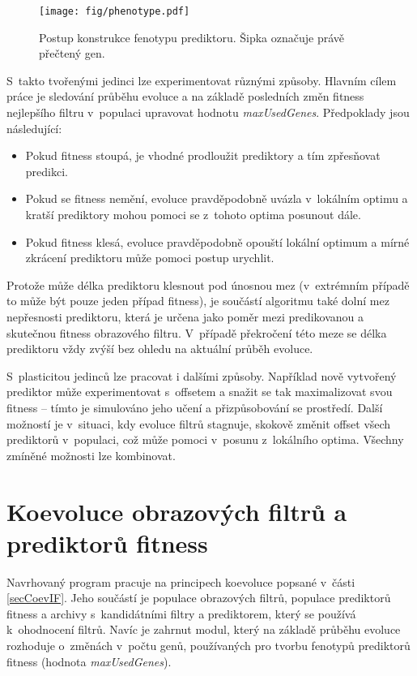 \begin{figure}[htb]
    \centering\texttt{[image: fig/phenotype.pdf]}
    \caption{Postup konstrukce fenotypu prediktoru. Šipka označuje právě přečtený gen.}
    \label{obrFenotyp}
\end{figure}

S~takto tvořenými jedinci lze experimentovat různými způsoby. Hlavním cílem práce je sledování průběhu evoluce a na základě posledních změn fitness nejlepšího filtru v~populaci upravovat hodnotu \emph{maxUsedGenes}. Předpoklady jsou následující:

\begin{itemize}
    \item Pokud fitness stoupá, je vhodné prodloužit prediktory a tím zpřesňovat predikci.
    \item Pokud se fitness nemění, evoluce pravděpodobně uvázla v~lokálním optimu a kratší prediktory mohou pomoci se z~tohoto optima posunout dále.
    \item Pokud fitness klesá, evoluce pravděpodobně opouští lokální optimum a mírné zkrácení prediktoru může pomoci postup urychlit.
\end{itemize}

Protože může délka prediktoru klesnout pod únosnou mez (v~extrémním případě to může být pouze jeden případ fitness), je součástí algoritmu také dolní mez nepřesnosti prediktoru, která je určena jako poměr mezi predikovanou a skutečnou fitness obrazového filtru. V~případě překročení této meze se délka prediktoru vždy zvýší bez ohledu na aktuální průběh evoluce.

S~plasticitou jedinců lze pracovat i dalšími způsoby. Například nově vytvořený prediktor může experimentovat s~offsetem a snažit se tak maximalizovat svou fitness -- tímto je simulováno jeho učení a přizpůsobování se prostředí. Další možností je v~situaci, kdy evoluce filtrů stagnuje, skokově změnit offset všech prediktorů v~populaci, což může pomoci v~posunu z~lokálního optima. Všechny zmíněné možnosti lze kombinovat.

\section{Koevoluce obrazových filtrů a prediktorů fitness}
\label{secDesignCoev}

Navrhovaný program pracuje na principech koevoluce popsané v~části \ref{secCoevIF}. Jeho součástí je populace obrazových filtrů, populace prediktorů fitness a archivy s~kandidátními filtry a prediktorem, který se používá k~ohodnocení filtrů. Navíc je zahrnut modul, který na základě průběhu evoluce rozhoduje o~změnách v~počtu genů, používaných pro tvorbu fenotypů prediktorů fitness (hodnota \emph{maxUsedGenes}).

